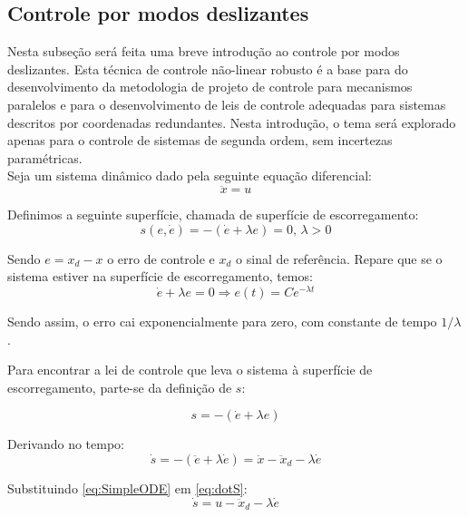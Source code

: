 \documentclass[a4paper,11pt,brazil,fleqn]{article}
\begin{document}
\subsection{Controle por modos deslizantes}\label{S04-2}

Nesta subse\c{c}\~ao ser\'a feita uma breve introdu\c{c}\~ao ao controle por modos deslizantes. Esta t\'ecnica de controle n\~ao-linear robusto \'e a base para do desenvolvimento da metodologia de projeto de controle para mecanismos paralelos e para o desenvolvimento de leis de controle adequadas para sistemas descritos por coordenadas redundantes. Nesta introdu\c{c}\~ao, o tema ser\'a explorado apenas para o controle de sistemas de segunda ordem, sem incertezas param\'etricas. \\

Seja um sistema din\^amico dado pela seguinte equa\c{c}\~ao diferencial:
\begin{equation} \label{eq:SimpleODE}
\ddot{x} = u
\end{equation}

Definimos a seguinte superf\'icie, chamada de superf\'icie de escorregamento:
\begin{equation} \label{eq:SlidingSurface}
s(e, \dot{e}) = - (\dot{e} + \lambda e) = 0, \, \lambda > 0
\end{equation}

Sendo $e = x_d - x$ o erro de controle e $x_d$ o sinal de refer\^encia. Repare que se o sistema estiver na superf\'icie de escorregamento, temos:
\begin{equation} \label{eq:SlidingError}
\dot{e} + \lambda e = 0 \Rightarrow e(t) = C e^{- \lambda t}
\end{equation}

Sendo assim, o erro cai exponencialmente para zero, com constante de tempo $1/\lambda$.

Para encontrar a lei de controle que leva o sistema \`a superf\'icie de escorregamento, parte-se da defini\c{c}\~ao de $s$:

$$ s = -(\dot{e} + \lambda e) $$

Derivando no tempo:
\begin{equation} \label{eq:dotS}
\dot{s} =  -(\ddot{e} + \lambda \dot{e}) = \ddot{x} - \ddot{x}_d - \lambda \dot{e} 
\end{equation}

Substituindo \eqref{eq:SimpleODE} em \eqref{eq:dotS}:
\begin{equation} \label{dotS2}
\dot{s} = u - \ddot{x}_d - \lambda \dot{e}
\end{equation}
\end{document}
